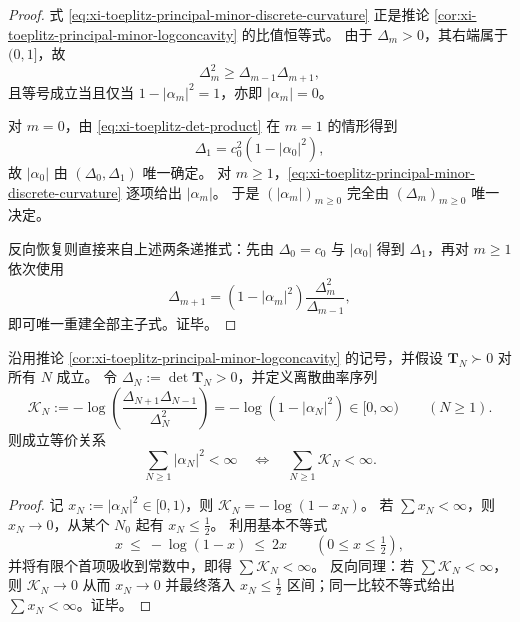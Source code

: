 \begin{proof}
式 \eqref{eq:xi-toeplitz-principal-minor-discrete-curvature} 正是推论
\ref{cor:xi-toeplitz-principal-minor-logconcavity} 的比值恒等式。
由于 \(\Delta_m>0\)，其右端属于 \((0,1]\)，故
\[
\Delta_m^2\ge \Delta_{m-1}\Delta_{m+1},
\]
且等号成立当且仅当 \(1-|\alpha_m|^2=1\)，亦即 \(|\alpha_m|=0\)。

对 \(m=0\)，由 \eqref{eq:xi-toeplitz-det-product} 在 \(m=1\) 的情形得到
\[
\Delta_1=c_0^2(1-|\alpha_0|^2),
\]
故 \(|\alpha_0|\) 由 \((\Delta_0,\Delta_1)\) 唯一确定。
对 \(m\ge 1\)，\eqref{eq:xi-toeplitz-principal-minor-discrete-curvature} 逐项给出 \(|\alpha_m|\)。
于是 \((|\alpha_m|)_{m\ge 0}\) 完全由 \((\Delta_m)_{m\ge 0}\) 唯一决定。

反向恢复则直接来自上述两条递推式：先由 \(\Delta_0=c_0\) 与 \(|\alpha_0|\) 得到 \(\Delta_1\)，再对 \(m\ge 1\) 依次使用
\[
\Delta_{m+1}=(1-|\alpha_m|^2)\frac{\Delta_m^2}{\Delta_{m-1}},
\]
即可唯一重建全部主子式。证毕。
\end{proof}

\begin{proposition}\label{prop:xi-toeplitz-curvature-energy-equivalence}
沿用推论 \ref{cor:xi-toeplitz-principal-minor-logconcavity} 的记号，并假设 \(\mathbf{T}_N\succ 0\) 对所有 \(N\) 成立。
令 \(\Delta_N:=\det\mathbf{T}_N>0\)，并定义离散曲率序列
\[
\mathcal{K}_N:=-\log\!\left(\frac{\Delta_{N+1}\Delta_{N-1}}{\Delta_N^{2}}\right)
=-\log(1-|\alpha_N|^2)\in[0,\infty)\qquad(N\ge 1).
\]
则成立等价关系
\[
\boxed{\;
\sum_{N\ge 1}|\alpha_N|^2<\infty
\quad\Longleftrightarrow\quad
\sum_{N\ge 1}\mathcal{K}_N<\infty.\;}
\]
\end{proposition}
\begin{proof}
记 \(x_N:=|\alpha_N|^2\in[0,1)\)，则 \(\mathcal{K}_N=-\log(1-x_N)\)。
若 \(\sum x_N<\infty\)，则 \(x_N\to 0\)，从某个 \(N_0\) 起有 \(x_N\le \tfrac12\)。
利用基本不等式
\[
x\ \le\ -\log(1-x)\ \le\ 2x\qquad(0\le x\le\tfrac12),
\]
并将有限个首项吸收到常数中，即得 \(\sum \mathcal{K}_N<\infty\)。
反向同理：若 \(\sum\mathcal{K}_N<\infty\)，则 \(\mathcal{K}_N\to 0\) 从而 \(x_N\to 0\) 并最终落入 \(x_N\le\tfrac12\) 区间；同一比较不等式给出 \(\sum x_N<\infty\)。证毕。
\end{proof}

